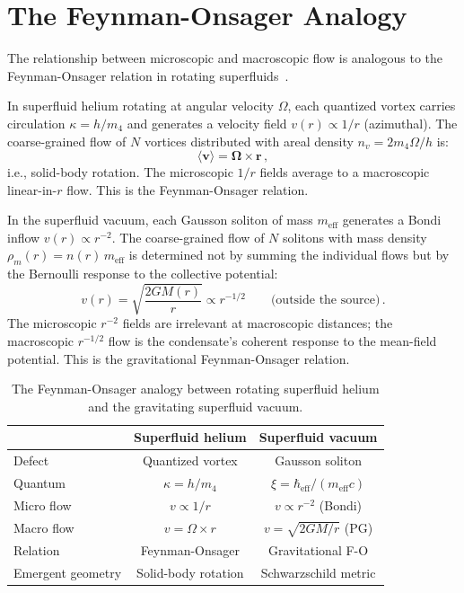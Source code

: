 \documentclass[12pt, a4paper]{article}
\newcommand{\meff}{m_{\mathrm{eff}}}
\newcommand{\heff}{\hbar_{\mathrm{eff}}}
\begin{document}
\section{The Feynman-Onsager Analogy}
\label{sec:feynman_onsager}

The relationship between microscopic and macroscopic
flow is analogous to the Feynman-Onsager relation in
rotating superfluids~\cite{feynman_1955,volovik_2003}.

In superfluid helium rotating at angular velocity
$\Omega$, each quantized vortex carries circulation
$\kappa = h/m_4$ and generates a velocity field
$v(r) \propto 1/r$ (azimuthal). The coarse-grained
flow of $N$ vortices distributed with areal density
$n_v = 2m_4\Omega/h$ is:
\begin{equation}
    \langle \mathbf{v} \rangle = \mathbf{\Omega}
    \times \mathbf{r}\,,
\label{eq:feynman_onsager}
\end{equation}
i.e., solid-body rotation. The microscopic $1/r$
fields average to a macroscopic linear-in-$r$ flow.
This is the Feynman-Onsager relation.

In the superfluid vacuum, each Gausson soliton of mass
$\meff$ generates a Bondi inflow
$v(r) \propto r^{-2}$. The coarse-grained flow of $N$
solitons with mass density
$\rho_m(r) = n(r)\,\meff$ is determined not by
summing the individual flows but by the Bernoulli
response to the collective potential:
\begin{equation}
    v(r) = \sqrt{\frac{2GM(r)}{r}} \propto r^{-1/2}
    \qquad\text{(outside the source)}\,.
\label{eq:grav_FO}
\end{equation}
The microscopic $r^{-2}$ fields are irrelevant at
macroscopic distances; the macroscopic $r^{-1/2}$ flow
is the condensate's coherent response to the
mean-field potential. This is the gravitational
Feynman-Onsager relation.

\begin{table}[H]
\centering
\caption{The Feynman-Onsager analogy between rotating
superfluid helium and the gravitating superfluid
vacuum.}
\begin{tabular}{lcc}
\hline
& \textbf{Superfluid helium} & \textbf{Superfluid vacuum} \\
\hline
Defect & Quantized vortex & Gausson soliton \\
Quantum & $\kappa = h/m_4$ & $\xi = \heff/(\meff c)$ \\
Micro flow & $v \propto 1/r$ & $v \propto r^{-2}$ (Bondi) \\
Macro flow & $v = \Omega \times r$ & $v = \sqrt{2GM/r}$ (PG) \\
Relation & Feynman-Onsager & Gravitational F-O \\
Emergent geometry & Solid-body rotation & Schwarzschild metric \\
\hline
\end{tabular}
\label{tab:analogy}
\end{table}
\end{document}
